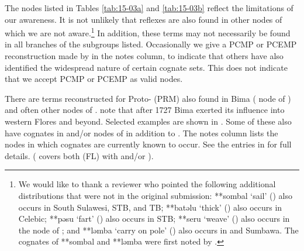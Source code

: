 The nodes listed in Tables \ref{tab:15-03a} and \ref{tab:15-03b}
reflect the limitations of our awareness.
It is not unlikely that reflexes are also found in other nodes
of which we are not aware.\footnote{
		We would like to thank a reviewer who pointed the following additional
		distributions that were not in the original submission: **sombal
		‘sail’ () also occurs in South Sulawesi,
		STB, and TB; **batəlu ‘thick’ () also occurs in Celebic;
		**pəsu ‘fart’ () also occurs in STB; **seru ‘weave’
		() also occurs in the  node of ;
		and **ləmba ‘carry on pole’ () also occurs in  and Sumbawa.
		The  cognates of **sombal
		and **ləmba were first noted by \citet[68, 70]{Mills1981}.}
In addition,
these terms may not necessarily be found in all branches of the subgroups listed.
Occasionally we give a PCMP or PCEMP reconstruction made by \citet{BlustTrussel2020}
in the notes column,
to indicate that others have also identified the widespread nature
of certain cognate sets.
This does not indicate that we accept PCMP or PCEMP as valid nodes.

There are terms reconstructed for Proto- (PRM)
also found in Bima ( node of )
and often other nodes of .
\citet{VerheijenGrimes1995} note that after 1727 Bima exerted
its influence into western Flores and beyond.
Selected examples are shown in .
Some of these also have cognates in  and/or
nodes of  in addition to .
The notes column lists the nodes in which cognates are currently known to occur.
See the entries in \citet{Edwards2021} for full details.
( covers both  (FL) with  and/or ).

